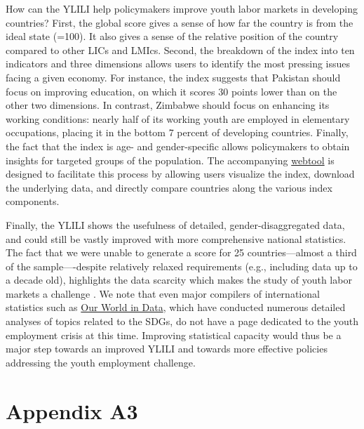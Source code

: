 \documentclass[
  a4paper, twoside, 12pt]{book}
\begin{document}
How can the YLILI help policymakers improve youth labor markets in developing countries? First, the global score gives a sense of how far the country is from the ideal state (=100). It also gives a sense of the relative position of the country compared to other LICs and LMIcs. Second, the breakdown of the index into ten indicators and three dimensions allows users to identify the most pressing issues facing a given economy. For instance, the index suggests that Pakistan should focus on improving education, on which it scores 30 points lower than on the other two dimensions. In contrast, Zimbabwe should focus on enhancing its working conditions: nearly half of its working youth are employed in elementary occupations, placing it in the bottom 7 percent of developing countries. Finally, the fact that the index is age- and gender-specific allows policymakers to obtain insights for targeted groups of the population. The accompanying \href{https://nadel.shinyapps.io/ylili/}{webtool} is designed to facilitate this process by allowing users visualize the index, download the underlying data, and directly compare countries along the various index components.

Finally, the YLILI shows the usefulness of detailed, gender-disaggregated data, and could still be vastly improved with more comprehensive national statistics. The fact that we were unable to generate a score for 25 countries---almost a third of the sample----despite relatively relaxed requirements (e.g., including data up to a decade old), highlights the data scarcity which makes the study of youth labor markets a challenge \autocite{jerven2013}. We note that even major compilers of international statistics such as \href{https://ourworldindata.org/}{Our World in Data}, which have conducted numerous detailed analyses of topics related to the SDGs, do not have a page dedicated to the youth employment crisis at this time. Improving statistical capacity would thus be a major step towards an improved YLILI and towards more effective policies addressing the youth employment challenge.

\newpage
{}
\printbibliography[segment=\therefsegment,heading=subbibintoc,title={References}]

\newpage

\hypertarget{appendix-a}{%
\section*{Appendix A3}\label{appendix-a}}
\end{document}
